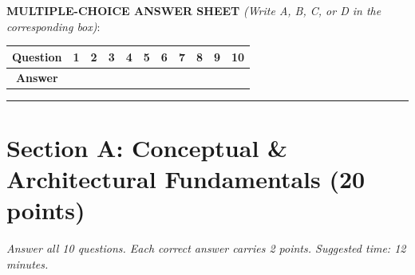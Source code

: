\documentclass[11pt,a4paper]{article}
\begin{document}
\vspace{0.6mm}

\noindent

\textbf{MULTIPLE-CHOICE ANSWER SHEET}
\textit{(Write A, B, C, or D in the corresponding box)}:

\begin{center}

\begin{tabular}{|c|c|c|c|c|c|c|c|c|c|c|}

  \hline

  \textbf{Question} & \textbf{1} & \textbf{2} & \textbf{3} & \textbf{4} &
  \textbf{5} & \textbf{6} & \textbf{7} & \textbf{8} & \textbf{9} & \textbf{10} \\

  \hline

  \textbf{Answer} & & & & & & & & & & \\[2mm]

  \hline

\end{tabular}

\end{center}

\vspace{-2.5mm}
\hrule
\vspace{0.8mm}




\section*{Section A: Conceptual \& Architectural Fundamentals \hfill \normalsize\normalfont(20 points)}

\textit{Answer all 10 questions. Each correct answer carries 2 points. Suggested time: 12 minutes.}

\vspace{0.08cm}
\end{document}
